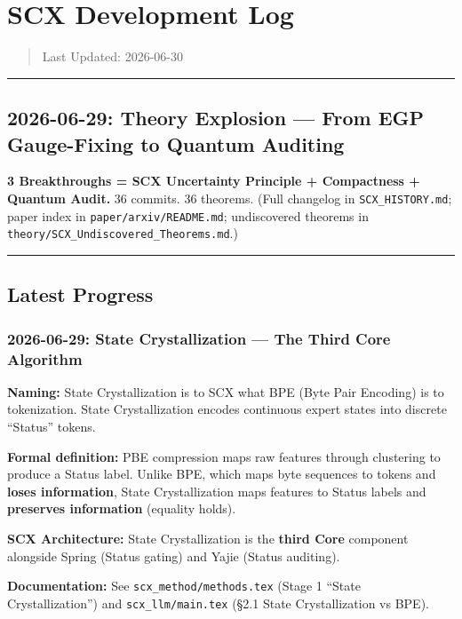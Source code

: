 \documentclass[12pt]{article}
\author{SCX}
\date{2026}
\begin{document}
\section{SCX Development Log}\label{scx-development-log}
\begin{quote}
Last Updated: 2026-06-30
\end{quote}
\begin{center}\rule{0.5\linewidth}{0.5pt}\end{center}

\subsection{2026-06-29: Theory Explosion --- From EGP Gauge-Fixing to Quantum Auditing}
\textbf{3 Breakthroughs = SCX Uncertainty Principle + Compactness + Quantum Audit.}
36 commits. 36 theorems. (Full changelog in \texttt{SCX\_HISTORY.md}; paper index in \texttt{paper/arxiv/README.md}; undiscovered theorems in \texttt{theory/SCX\_Undiscovered\_Theorems.md}.)

\begin{center}\rule{0.5\linewidth}{0.5pt}\end{center}

\subsection{Latest Progress}
\subsubsection{2026-06-29: State Crystallization --- The Third Core Algorithm}
\textbf{Naming:} State Crystallization is to SCX what BPE (Byte Pair Encoding) is to tokenization. State Crystallization encodes continuous expert states into discrete ``Status'' tokens.\par
\textbf{Formal definition:} PBE compression maps raw features through clustering to produce a Status label. Unlike BPE, which maps byte sequences to tokens and \textbf{loses information}, State Crystallization maps features to Status labels and \textbf{preserves information} (equality holds).\par
\textbf{SCX Architecture:} State Crystallization is the \textbf{third Core} component alongside Spring (Status gating) and Yajie (Status auditing).\par
\textbf{Documentation:} See \texttt{scx\_method/methods.tex} (Stage 1 ``State Crystallization'') and \texttt{scx\_llm/main.tex} (\S 2.1 State Crystallization vs BPE).
\end{document}
